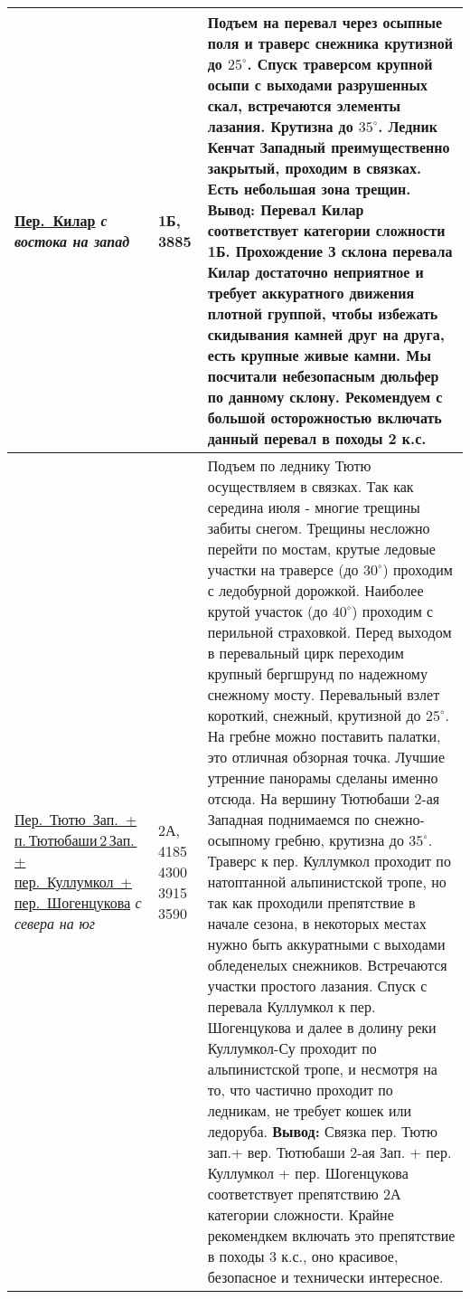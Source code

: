 {\begin{longtable}{|>{\centering\arraybackslash}m{3.8cm}|>{\centering\arraybackslash}m{1.3cm}|>{\raggedright\arraybackslash}m{12.5cm}|}
			\hyperref[subsec:Day16]{Пер.~Килар}																		\newline\textit{с востока на запад}		&	1Б, 3885					&	Подъем на перевал через осыпные поля и траверс снежника крутизной до $25^\circ$. Спуск траверсом крупной осыпи с выходами разрушенных скал, встречаются элементы лазания. Крутизна до $35^\circ$. Ледник Кенчат Западный преимущественно закрытый, проходим в связках. Есть небольшая зона трещин. \newline \textbf{Вывод:} Перевал Килар соответствует категории сложности 1Б. Прохождение З склона перевала Килар достаточно неприятное и требует аккуратного движения плотной группой, чтобы избежать скидывания камней друг на друга, есть крупные живые камни. Мы посчитали небезопасным дюльфер по данному склону. Рекомендуем с большой осторожностью включать данный перевал в походы 2 к.с.																																																																																																																																																																																																																																																																																																																																																	\\ \hline
			\hyperref[subsec:Day17]{Пер.~Тютю~Зап.~+ п.\,Тютюбаши\,2\,Зап.\,+ пер.~Куллумкол~+ пер.~Шогенцукова}	\newline\textit{с севера на юг}			&	2А,	4185 4300 3915 3590		&	Подъем по леднику Тютю осуществляем в связках. Так как середина июля - многие трещины забиты снегом. Трещины несложно перейти по мостам, крутые ледовые участки на траверсе (до $30^\circ$) проходим с ледобурной дорожкой. Наиболее крутой участок (до $40^\circ$) проходим с перильной страховкой. Перед выходом в перевальный цирк переходим крупный бергшрунд по надежному снежному мосту. Перевальный взлет короткий, снежный, крутизной до $25^\circ$. На гребне можно поставить палатки, это отличная обзорная точка. Лучшие утренние панорамы сделаны именно отсюда. На вершину Тютюбаши 2-ая Западная поднимаемся по снежно-осыпному гребню, крутизна до $35^\circ$. Траверс к пер. Куллумкол проходит по натоптанной альпинистской тропе, но так как проходили препятствие в начале сезона, в некоторых местах нужно быть аккуратными с выходами обледенелых снежников. Встречаются участки простого лазания. Спуск с перевала Куллумкол к пер. Шогенцукова и далее в долину реки Куллумкол-Су проходит по альпинистской тропе, и несмотря на то, что частично проходит по ледникам, не требует кошек или ледоруба. \newline \textbf{Вывод:} Связка пер. Тютю зап.+ вер. Тютюбаши 2-ая Зап. + пер. Куллумкол + пер. Шогенцукова соответствует препятствию 2А категории сложности. Крайне рекомендкем включать это препятствие в походы 3 к.с., оно красивое, безопасное и технически интересное.																																																																																																																																																														\\ \hline
		\end{longtable}}
		\setlength{\arraycolsep}{5pt}
		\renewcommand{\arraystretch}{1.8}
\pagebreak
